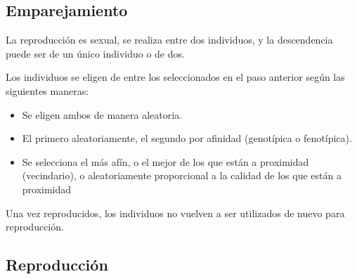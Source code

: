 \documentclass[12pt, twoside, openright]{report} %
\begin{document}
\subsection{Emparejamiento}
La reproducción es sexual, se realiza entre dos individuos, y la descendencia puede ser de un único individuo o de dos.

Los individuos se eligen de entre los seleccionados en el paso anterior según las siguientes maneras:
\begin{itemize}
	\item Se eligen ambos de manera aleatoria.
	\item El primero aleatoriamente, el segundo por afinidad (genotípica o fenotípica).
	\item Se selecciona el más afín, o el mejor de los que están a proximidad (vecindario), o aleatoriamente proporcional a la calidad de los que están a proximidad
\end{itemize}
Una vez reproducidos, los individuos no vuelven a ser utilizados de nuevo para reproducción.

\subsection{Reproducción}
\end{document}
